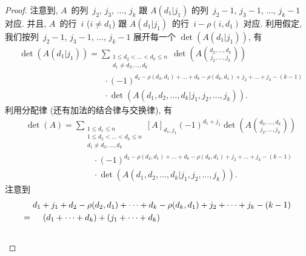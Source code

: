 \begin{proof}
    注意到,
    \(A\)~的列~\(j_2\), \(j_3\), \(\dots\), \(j_k\)
    跟 \(A(d_1|j_1)\) 的列~\(j_2 - 1\),
    \(j_3 - 1\), \(\dots\), \(j_k - 1\)
    对应.
    并且, \(A\)~的行~\(i\) (\(i \neq d_1\))
    跟 \(A(d_1|j_1)\)~的行~\(i - \rho(i, d_1)\) 对应.
    利用假定,
    我们按列~\(j_2 - 1\), \(j_3 - 1\), \(\dots\), \(j_k - 1\)
    展开每一个 \(\det {(A(d_1|j_1))}\),
    有
    \begin{align*}
         &
        \det {(A(d_1|j_1))}
        = \sum_{\substack{
        1 \leq d_2 < \dots < d_k \leq n \\
                d_1 \neq d_2,\dots,d_k
            }}
        {\det {\left(
                A\binom{d_2, \dots, d_k}{j_2, \dots, j_k}
                \right)}}
        \\
         &
        \qquad \qquad \qquad \qquad \qquad
        \cdot (-1)^{d_2 - \rho(d_2, d_1) + \dots
            + d_k - \rho(d_k, d_1)
            + j_2 + \dots + j_k - (k - 1)}
        \\
         &
        \qquad \qquad \qquad \qquad \qquad
        \cdot \det
        {(A({d_1,d_2,\dots,d_k}|{j_1,j_2,\dots,j_k}))}.
    \end{align*}
    利用分配律 (还有加法的结合律与交换律), 有
    \begin{align*}
         &
        \det {(A)}
        = \sum_{\substack{
        1 \leq d_1 \leq n               \\
        1 \leq d_2 < \dots < d_k \leq n \\
                d_1 \neq d_2,\dots,d_k
            }}
        {[A]_{d_1,j_1}
            (-1)^{d_1 + j_1}
            \det {\left(
                A\binom{d_2, \dots, d_k}{j_2, \dots, j_k}
                \right)}}
        \\
         &
        \qquad \qquad \qquad \qquad
        \cdot (-1)^{d_2 - \rho(d_2, d_1) + \dots
            + d_k - \rho(d_k, d_1)
            + j_2 + \dots + j_k - (k - 1)}
        \\
         &
        \qquad \qquad \qquad \qquad
        \cdot \det {(A({d_1,d_2,\dots,d_k}|{j_1,j_2,\dots,j_k}))}.
    \end{align*}
    注意到
    \begin{align*}
             &
        d_1 + j_1 + d_2 - \rho(d_2, d_1) + \dots
        + d_k - \rho(d_k, d_1)
        + j_2 + \dots + j_k - (k - 1)
        \\
        = {} &
        \hphantom{{} + {}}
        (d_1 + \dots + d_k) + (j_1 + \dots + d_k)
        \\
             &

\end{align*}
\end{proof}
